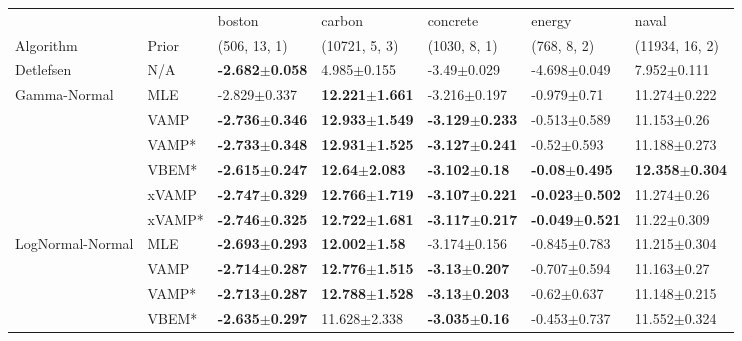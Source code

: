 \begin{tabular}{lllllll}
\toprule
                 &        &                     boston &                     carbon &                   concrete &                     energy &                      naval \\
Algorithm & Prior& (506, 13, 1)& (10721, 5, 3)& (1030, 8, 1)& (768, 8, 2)& (11934, 16, 2)\\
\midrule
Detlefsen & N/A &  \textbf{-2.682$\pm$0.058} &            4.985$\pm$0.155 &            -3.49$\pm$0.029 &           -4.698$\pm$0.049 &            7.952$\pm$0.111 \\
Gamma-Normal & MLE &           -2.829$\pm$0.337 &  \textbf{12.221$\pm$1.661} &           -3.216$\pm$0.197 &            -0.979$\pm$0.71 &           11.274$\pm$0.222 \\
                 & VAMP &  \textbf{-2.736$\pm$0.346} &  \textbf{12.933$\pm$1.549} &  \textbf{-3.129$\pm$0.233} &           -0.513$\pm$0.589 &            11.153$\pm$0.26 \\
                 & VAMP* &  \textbf{-2.733$\pm$0.348} &  \textbf{12.931$\pm$1.525} &  \textbf{-3.127$\pm$0.241} &            -0.52$\pm$0.593 &           11.188$\pm$0.273 \\
                 & VBEM* &  \textbf{-2.615$\pm$0.247} &   \textbf{12.64$\pm$2.083} &   \textbf{-3.102$\pm$0.18} &   \textbf{-0.08$\pm$0.495} &  \textbf{12.358$\pm$0.304} \\
                 & xVAMP &  \textbf{-2.747$\pm$0.329} &  \textbf{12.766$\pm$1.719} &  \textbf{-3.107$\pm$0.221} &  \textbf{-0.023$\pm$0.502} &            11.274$\pm$0.26 \\
                 & xVAMP* &  \textbf{-2.746$\pm$0.325} &  \textbf{12.722$\pm$1.681} &  \textbf{-3.117$\pm$0.217} &  \textbf{-0.049$\pm$0.521} &            11.22$\pm$0.309 \\
LogNormal-Normal & MLE &  \textbf{-2.693$\pm$0.293} &   \textbf{12.002$\pm$1.58} &           -3.174$\pm$0.156 &           -0.845$\pm$0.783 &           11.215$\pm$0.304 \\
                 & VAMP &  \textbf{-2.714$\pm$0.287} &  \textbf{12.776$\pm$1.515} &   \textbf{-3.13$\pm$0.207} &           -0.707$\pm$0.594 &            11.163$\pm$0.27 \\
                 & VAMP* &  \textbf{-2.713$\pm$0.287} &  \textbf{12.788$\pm$1.528} &   \textbf{-3.13$\pm$0.203} &            -0.62$\pm$0.637 &           11.148$\pm$0.215 \\
                 & VBEM* &  \textbf{-2.635$\pm$0.297} &           11.628$\pm$2.338 &   \textbf{-3.035$\pm$0.16} &           -0.453$\pm$0.737 &           11.552$\pm$0.324 \\

\end{tabular}
